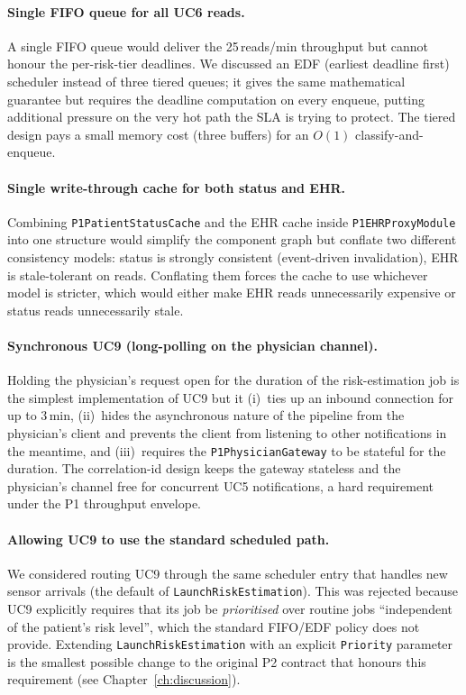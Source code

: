 \paragraph{Single FIFO queue for all UC6 reads.}
A single FIFO queue would deliver the 25\,reads/min throughput but cannot
honour the per-risk-tier deadlines. We discussed an EDF (earliest
deadline first) scheduler instead of three tiered queues; it gives the
same mathematical guarantee but requires the deadline computation on
every enqueue, putting additional pressure on the very hot path the SLA
is trying to protect. The tiered design pays a small memory cost (three
buffers) for an $O(1)$ classify-and-enqueue.

\paragraph{Single write-through cache for both status and EHR.}
Combining \texttt{P1PatientStatusCache} and the EHR cache inside
\texttt{P1EHRProxyModule} into one structure would simplify the component
graph but conflate two different consistency models: status is strongly
consistent (event-driven invalidation), EHR is stale-tolerant on reads.
Conflating them forces the cache to use whichever model is stricter,
which would either make EHR reads unnecessarily expensive or status
reads unnecessarily stale.

\paragraph{Synchronous UC9 (long-polling on the physician channel).}
Holding the physician's request open for the duration of the
risk-estimation job is the simplest implementation of UC9 but it (i)~ties
up an inbound connection for up to 3\,min, (ii)~hides the asynchronous
nature of the pipeline from the physician's client and prevents the
client from listening to other notifications in the meantime, and
(iii)~requires the \texttt{P1PhysicianGateway} to be stateful for the
duration. The correlation-id design keeps the gateway stateless and the
physician's channel free for concurrent UC5 notifications, a hard
requirement under the P1 throughput envelope.

\paragraph{Allowing UC9 to use the standard scheduled path.}
We considered routing UC9 through the same scheduler entry that handles
new sensor arrivals (the default of \texttt{LaunchRiskEstimation}). This
was rejected because UC9 explicitly requires that its job be
\emph{prioritised} over routine jobs ``independent of the patient's risk
level'', which the standard FIFO/EDF policy does not provide. Extending
\texttt{LaunchRiskEstimation} with an explicit \texttt{Priority}
parameter is the smallest possible change to the original P2 contract
that honours this requirement (see Chapter~\ref{ch:discussion}).


